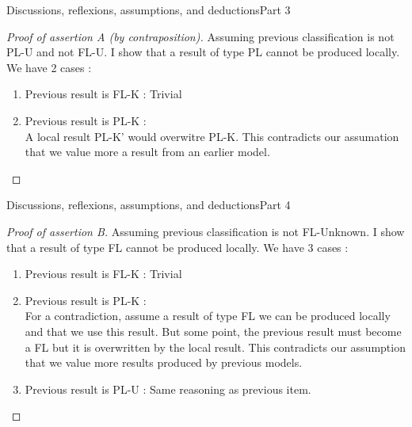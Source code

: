 \documentclass[8pt]{beamer}
\begin{document}
\begin{frame}{Discussions, reflexions, assumptions, and deductions}{Part 3}
    \begin{proof}[Proof of assertion A (by contraposition)]
        Assuming previous classification is not PL-U and not FL-U.
        I show that a result of type PL cannot be produced locally.
        We have 2 cases :
        \begin{enumerate}
            \item Previous result is FL-K : Trivial
            \item Previous result is PL-K : \\
                A local result PL-K' would overwitre PL-K. This contradicts
                our assumation that we value more a result from an earlier model.
        \end{enumerate}
    \end{proof}
\end{frame}

\begin{frame}{Discussions, reflexions, assumptions, and deductions}{Part 4}
    \begin{proof}[Proof of assertion B]
        Assuming previous classification is not FL-Unknown.
        I show that a result of type FL cannot be produced locally.
        We have 3 cases :
        \begin{enumerate}
            \item Previous result is FL-K : Trivial
            \item Previous result is PL-K : \\
                For a contradiction, assume a result of type FL we can be produced locally
                and that we use this result.
                But some point, the previous result must become a FL but it
                is overwritten by the local result. This contradicts our
                assumption that we value more results produced by previous models.
            \item Previous result is PL-U : Same reasoning as previous item.
        \end{enumerate}
    \end{proof}
\end{frame}
\end{document}

